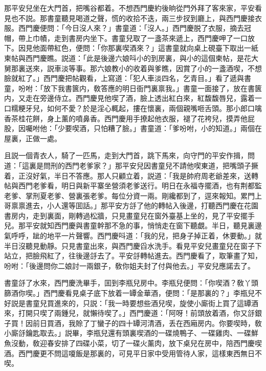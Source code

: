 那平安兒坐在大門首，把嘴谷都着。不想西門慶約後晌從門外拜了客來家，平安看見也不説。那書童聽見喝道之聲，慌的收拾不迭，兩三步扠到廳上，與西門慶接衣服。西門慶便問：「今日沒人來？」書童道：「沒人。」西門慶脱了衣服，摘去冠帽，帶上巾幘，走到書房内坐下。書童兒取了一盞茶來遞上，西門慶呷了一口放下。因見他面帶紅色，便問：「你那裏喫酒來？」這書童就向桌上硯臺下取出一紙柬帖與西門慶瞧。説道：「此是後邊六娘呌小的到房裏，與小的這個柬帖，是花大舅那裏送來，説車淡等事。那六娘教小的收着與爹瞧，因賞了小的一盞酒喫，不想臉就紅了。」西門慶把帖觀看，上寫道：「犯人車淡四名，乞青目。」看了遞與書童，吩咐：「放下我書篋内，敎答應的明日衙門裏禀我。」書童一面接了，放在書篋内，又走在旁邊侍立。西門慶見他喫了酒，臉上透出紅白來，紅馥馥唇兒，露着一口糯粳牙兒，如何不愛？於是淫心輒起，摟在懷裏，兩個親嘴咂舌頭。那小郎口噙香茶桂花餅，身上薰的噴鼻香。西門慶用手撩起他衣服，褪了花袴兒，摸弄他屁股，因囑咐他：「少要喫酒，只怕糟了臉。」書童道：「爹吩咐，小的知道。」兩個在屋裏，正做一處。

且説一個青衣人，騎了一匹馬，走到大門首，跳下馬來，向守門的平安作揖，問道：「這裏是問刑的西門老爹家？」那平安兒因書童兒不請他喫東道，把嘴頭子撅着，正沒好氣，半日不答應。那人只顧立着，説道：「我是帥府周老爺差來，送轉帖與西門老爹看，明日與新平寨坐營須老爹送行。明日在永福寺擺酒，也有荆都監老爹、掌刑夏老爹、營裏張老爹。每位分資一兩。剛纔都到了，逕來報知。累門上哥禀禀進去，小人還等囬話。」那平安方㧱了他的轉帖入後邊，打聽西門慶在花園書房内，走到裏面，剛轉過松牆，只見畫童兒在窗外臺基上坐的，見了平安擺手兒。那平安就知西門慶與書童幹那不急的事，悄悄走在窗下聽覷。半日，聽見裏邊氣呼呼，跐的地平一片聲響。西門慶呌道：「我的兒，把身子掉正着，休要動。」就半日沒聽見動靜。只見書童出來，與西門慶舀水洗手。看見平安兒畫童兒在窗子下站立，把臉飛紅了，往後邊㧱去了。平安㧱轉帖進去。西門慶看了，取筆畫了知，吩咐：「後邊問你二娘討一兩銀子，敎你姐夫封了付與他去。」平安兒應諾去了。

書童㧱了水來，西門慶洗畢手，囬到李瓶兒房中。李瓶兒便問：「你喫酒？敎丫頭篩酒你喫。」西門慶看見桌子底下放着一罈金華酒，便問：「是那裏的？」李瓶兒不好説是書童兒買進來的，只説：「我一時要想些酒兒喫，旋使小廝街上買了這罈酒來，打開只喫了兩鍾兒，就懶待喫了。」西門慶道：「阿呀！前頭放着酒，你又㧱銀子買！因前日買酒，我賒了丁蠻子的四十罈河清酒，丢在西廂房内。你要喫時，敎小廝㧱鑰匙取去。」説畢，李瓶兒還有頭裏喫酒的一碟燒鴨子、一碟雞肉、一碟鮮魚沒動，敎迎春安排了四碟小菜，切了一碟火薰肉，放下桌兒在房中，陪西門慶喫酒。西門慶更不問這嗄飯是那裏的，可見平日家中受用管待人家，這樣東西無日不喫。

